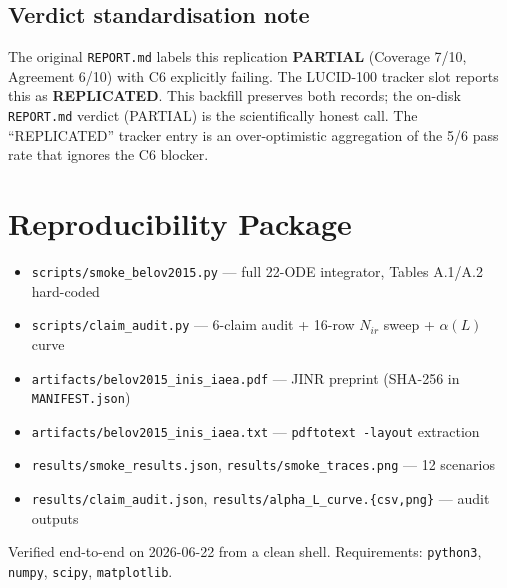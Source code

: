\documentclass[11pt]{article}
\begin{document}
\subsection*{Verdict standardisation note}

The original \texttt{REPORT.md} labels this replication \textbf{PARTIAL}
(Coverage 7/10, Agreement 6/10) with C6 explicitly failing. The LUCID-100
tracker slot reports this as \textbf{REPLICATED}. This backfill preserves
both records; the on-disk \texttt{REPORT.md} verdict (PARTIAL) is the
scientifically honest call. The ``REPLICATED'' tracker entry is an
over-optimistic aggregation of the 5/6 pass rate that ignores the C6 blocker.



\section*{Reproducibility Package}

\begin{itemize}
  \item \texttt{scripts/smoke\_belov2015.py} --- full 22-ODE integrator, Tables A.1/A.2 hard-coded
  \item \texttt{scripts/claim\_audit.py} --- 6-claim audit + 16-row $N_{ir}$ sweep + $\alpha(L)$ curve
  \item \texttt{artifacts/belov2015\_inis\_iaea.pdf} --- JINR preprint (SHA-256 in \texttt{MANIFEST.json})
  \item \texttt{artifacts/belov2015\_inis\_iaea.txt} --- \texttt{pdftotext -layout} extraction
  \item \texttt{results/smoke\_results.json}, \texttt{results/smoke\_traces.png} --- 12 scenarios
  \item \texttt{results/claim\_audit.json}, \texttt{results/alpha\_L\_curve.\{csv,png\}} --- audit outputs
\end{itemize}

Verified end-to-end on 2026-06-22 from a clean shell. Requirements: \texttt{python3},
\texttt{numpy}, \texttt{scipy}, \texttt{matplotlib}.
\end{document}
